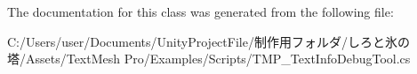 The documentation for this class was generated from the following file\+:\begin{DoxyCompactItemize}
\item 
C\+:/\+Users/user/\+Documents/\+Unity\+Project\+File/制作用フォルダ/しろと氷の塔/\+Assets/\+Text\+Mesh Pro/\+Examples/\+Scripts/T\+M\+P\+\_\+\+Text\+Info\+Debug\+Tool.\+cs\end{DoxyCompactItemize}
